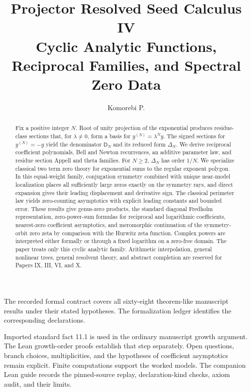 \documentclass[11pt,letterpaper]{article}
\title{\textbf{Projector Resolved Seed Calculus IV}\\[0.45em]
\large Cyclic Analytic Functions, Reciprocal Families, and Spectral Zero Data}
\author{Komorebi P.}
\date{}
\theoremstyle{definition}
\theoremstyle{remark}
\newcommand{\Dfun}{\mathsf D}
\begin{document}
\KomorebiCover
{}

\begin{abstract}
Fix a positive integer $N$. Root of unity projection of the exponential
produces residue-class sections that, for $\lambda\ne0$, form a basis for
$y^{(N)}=\lambda^N y$. The signed sections for $y^{(N)}=-y$ yield the
denominator $\Dfun_N$ and its reduced form $\Delta_N$. We derive reciprocal
coefficient polynomials, Bell and Newton recurrences, an additive parameter
law, and residue section Appell and theta families. For $N\geq2$,
$\Delta_N$ has order $1/N$. We specialize classical two term zero theory for
exponential sums to the regular exponent polygon. In this equal-weight family,
conjugation symmetry combined with unique near-model localization places all
sufficiently large zeros exactly on the symmetry rays, and direct expansion
gives their leading displacement and derivative sign. The classical perimeter
law yields zero-counting asymptotics with explicit leading constants and
bounded error. These results give genus-zero products, the standard diagonal
Fredholm representation, zero-power-sum formulas for reciprocal and
logarithmic coefficients, nearest-zero coefficient asymptotics, and
meromorphic continuation of the symmetry-orbit zero zeta by comparison with
the Hurwitz zeta function. Complex powers are interpreted either formally or
through a fixed logarithm on a zero-free domain. The paper treats only this
cyclic analytic family. Arithmetic interpolation, general nonlinear trees,
general resolvent theory, and abstract completion are reserved for Papers IX,
III, VI, and X.
\end{abstract}

\begin{readerroadmap}[title={Formal scope and evidence}]
The recorded formal contract covers all sixty-eight theorem-like manuscript results under their stated hypotheses. The formalization ledger identifies the corresponding declarations.

Imported standard fact 11.1 is used in the ordinary manuscript growth argument. The Lean growth-order proofs establish that step separately. Open questions, branch choices, multiplicities, and the hypotheses of coefficient asymptotics remain explicit. Finite computations support the worked models. The companion Lean guide records the pinned-source replay, declaration-kind checks, axiom audit, and their limits.
\end{readerroadmap}
\end{document}
